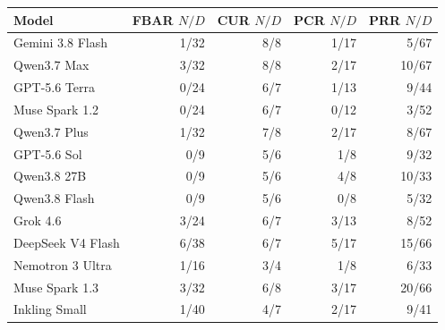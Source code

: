 \begin{tabular}{lrrrr}
\toprule
Model & FBAR $N/D$ & CUR $N/D$ & PCR $N/D$ & PRR $N/D$ \\
\midrule
Gemini 3.8 Flash & 1/32 & 8/8 & 1/17 & 5/67 \\
Qwen3.7 Max & 3/32 & 8/8 & 2/17 & 10/67 \\
GPT-5.6 Terra & 0/24 & 6/7 & 1/13 & 9/44 \\
Muse Spark 1.2 & 0/24 & 6/7 & 0/12 & 3/52 \\
Qwen3.7 Plus & 1/32 & 7/8 & 2/17 & 8/67 \\
GPT-5.6 Sol & 0/9 & 5/6 & 1/8 & 9/32 \\
Qwen3.8 27B & 0/9 & 5/6 & 4/8 & 10/33 \\
Qwen3.8 Flash & 0/9 & 5/6 & 0/8 & 5/32 \\
Grok 4.6 & 3/24 & 6/7 & 3/13 & 8/52 \\
DeepSeek V4 Flash & 6/38 & 6/7 & 5/17 & 15/66 \\
Nemotron 3 Ultra & 1/16 & 3/4 & 1/8 & 6/33 \\
Muse Spark 1.3 & 3/32 & 6/8 & 3/17 & 20/66 \\
Inkling Small & 1/40 & 4/7 & 2/17 & 9/41 \\
\bottomrule
\end{tabular}

